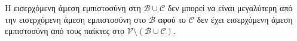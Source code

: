 \begin{proofsketch}
  Η εισερχόμενη άμεση εμπιστοσύνη στη $\mathcal{B} \cup \mathcal{C}$ δεν μπορεί να είναι μεγαλύτερη από την εισερχόμενη άμεση
  εμπιστοσύνη στο $\mathcal{B}$ αφού το $\mathcal{C}$ δεν έχει εισερχόμενη άμεση εμπιστοσύνη από τους παίκτες στο
  $\mathcal{V} \setminus \left(\mathcal{B} \cup \mathcal{C}\right)$.
\end{proofsketch}
